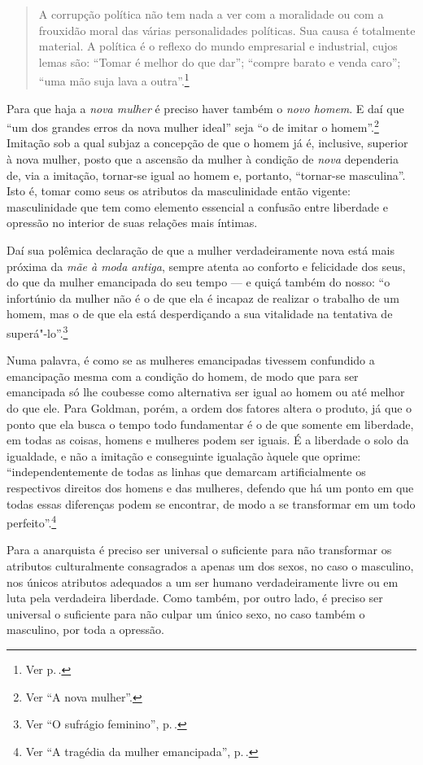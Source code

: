 \begin{quote}
A corrupção política não tem nada a ver com a
moralidade ou com a frouxidão moral das várias personalidades
políticas. Sua causa é totalmente material. A política é o reflexo do
mundo empresarial e industrial, cujos lemas são: ``Tomar é melhor do que
dar''; ``compre barato e venda caro''; ``uma mão suja lava a outra''.\footnote{Ver p.\,\pageref{suja}.}
\end{quote}

Para que haja a \textit{nova mulher} é preciso haver também o \textit{novo homem}. E
daí que ``um dos grandes erros da nova mulher ideal'' seja ``o de imitar
o homem''.\footnote{Ver ``A nova mulher''.} Imitação sob a qual subjaz a concepção de
que o homem já é, inclusive, superior à nova mulher, posto que a
ascensão da mulher à condição de \textit{nova} dependeria de, via a imitação,
tornar-se igual ao homem e, portanto, ``tornar-se masculina''. Isto é,
tomar como seus os atributos da masculinidade então vigente:
masculinidade que tem como elemento essencial a confusão entre liberdade e opressão no interior de suas relações mais íntimas.

Daí sua polêmica
declaração de que a mulher verdadeiramente nova está mais próxima da
\textit{mãe à moda antiga}, sempre atenta ao conforto e felicidade dos seus,
do que da mulher emancipada do seu tempo --- e quiçá também do nosso:
``o infortúnio da mulher não é o de que ela é incapaz de realizar o
trabalho de um homem, mas o de que ela está desperdiçando a sua
vitalidade na tentativa de superá"-lo''.\footnote{Ver ``O sufrágio feminino'', p.\,\pageref{secular}.}

Numa palavra, é como se as mulheres emancipadas tivessem
confundido a emancipação mesma com a condição do homem, de modo que para
ser emancipada só lhe coubesse como alternativa ser igual ao homem ou
até melhor do que ele. Para Goldman, porém, a ordem dos fatores
altera o produto, já que o ponto que ela
busca o tempo todo fundamentar é o de que somente em liberdade,
em todas as coisas, homens e mulheres podem ser iguais. É a liberdade
o solo da igualdade, e não a imitação e conseguinte igualação
àquele que oprime: ``independentemente de todas as linhas que demarcam artificialmente os
respectivos direitos dos homens e das mulheres, defendo que há um ponto
em que todas essas diferenças podem se encontrar, de modo a se
transformar em um todo perfeito''.\footnote{Ver ``A tragédia da mulher emancipada'', p.\,\pageref{perfeito}.}


Para
a anarquista é preciso ser universal o suficiente para não transformar
os atributos culturalmente consagrados a apenas um dos sexos, no caso o
masculino, nos únicos atributos adequados a um ser humano
verdadeiramente livre ou em luta pela verdadeira liberdade. Como também,
por outro lado, é preciso ser universal o suficiente para não culpar um
único sexo, no caso também o masculino, por toda a opressão.

